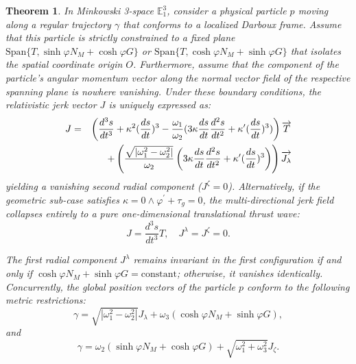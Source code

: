 \documentclass[reqno]{amsart}
\newtheorem{theorem}{Theorem}
\theoremstyle{plain}
\numberwithin{equation}{section}
\begin{document}
\begin{theorem}
In Minkowski 3-space $\mathbb{E}_1^3$, consider a physical particle $p$ moving along a regular trajectory $\gamma$ that conforms to a localized Darboux frame. Assume that this particle is strictly constrained to a fixed plane $\text{Span}\{T, \sinh \varphi N_{M} + \cosh \varphi G\}$ or $\text{Span}\{T, \cosh \varphi N_{M} + \sinh \varphi G\}$ that isolates the spatial coordinate origin $O$. Furthermore, assume that the component of the particle's angular momentum vector along the normal vector field of the respective spanning plane is nowhere vanishing. Under these boundary conditions, the relativistic jerk vector $J$ is uniquely expressed as:
\begin{eqnarray*}
J &=&\left( \frac{d^{3}s}{dt^{3}}+\kappa ^{2}(\frac{ds}{dt})^{3}-\frac{%
\omega _{1}}{\omega _{2}}(3\kappa \frac{ds}{dt}\frac{d^{2}s}{dt^{2}}+\kappa
^{\prime }(\frac{ds}{dt})^{3})\right) \overrightarrow{T} \\
&&+\left( \frac{\sqrt{\vert\omega _{1}^{2}-\omega _{2}^{2}\vert}}{\omega _{2}}\left(
3\kappa \frac{ds}{dt}\frac{d^{2}s}{dt^{2}}+\kappa ^{\prime }(\frac{ds}{dt}%
)^{3}\right) \right) \overrightarrow{J_{\lambda }}
\end{eqnarray*}%
yielding a vanishing second radial component ($J^{\zeta} = 0$). Alternatively, if the geometric sub-case satisfies $\kappa = 0 \wedge \varphi^{\prime} + \tau_g = 0$, the multi-directional jerk field collapses entirely to a pure one-dimensional translational thrust wave: 
\begin{equation*}
J = \frac{d^{3}s}{dt^{3}} T, \quad J^{\lambda} = J^{\zeta} = 0.
\end{equation*}

The first radial component $J^{\lambda}$ remains invariant in the first configuration if and only if $\cosh \varphi N_{M}+\sinh \varphi G = \text{constant}$; otherwise, it vanishes identically. Concurrently, the global position vectors of the particle $p$ conform to the following metric restrictions:
\begin{equation*}
\gamma = \sqrt{\left|\omega _{1}^{2}-\omega _{2}^{2}\right|} J_{\lambda} + \omega _{3} \left( \cosh \varphi N_{M} + \sinh \varphi G \right), 
\end{equation*}
and
\begin{equation*}
\gamma = \omega _{2} \left( \sinh \varphi N_{M} + \cosh \varphi G \right) + \sqrt{\omega _{1}^{2} + \omega _{3}^{2}} J_{\zeta}. 
\end{equation*}
\end{theorem}
\end{document}
